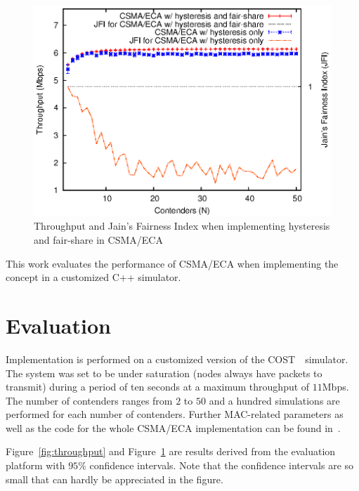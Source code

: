 \begin{figure}[htbp]
  \centering
  \includegraphics[width=0.95\linewidth]{figures/errorPlots/ECA-w-enhancements-FINAL.eps}
  \caption{Throughput and Jain's Fairness Index when implementing hysteresis and fair-share in CSMA/ECA
  \label{fig:fairShare}}
\end{figure}

This work evaluates the performance of CSMA/ECA when implementing the concept in a customized C++ simulator.

\section{Evaluation}

Implementation is performed on a customized version of the COST~\cite{COST}~simulator. The system was set to be under saturation (nodes always have packets to transmit) during a period of ten seconds at a maximum throughput of $11$Mbps. The number of contenders ranges from $2$ to $50$ and a hundred simulations are performed for each number of contenders. Further MAC-related parameters as well as the code for the whole CSMA/ECA implementation can be found in~\cite{sim:parameters}.

Figure~\ref{fig:throughput} and Figure~\ref{fig:fairShare} are results derived from the evaluation platform with $95\%$ confidence intervals. Note that the confidence intervals are so small that can hardly be appreciated in the figure.